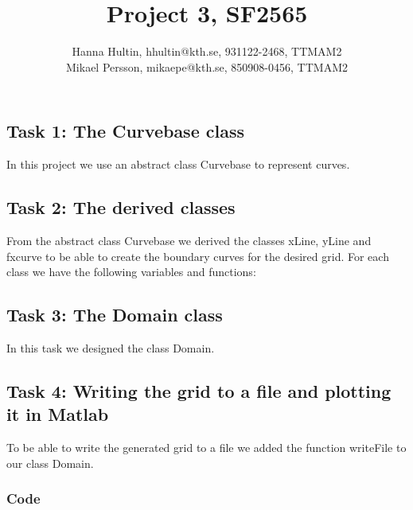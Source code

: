 \documentclass[a4paper,10pt]{article}
\title{Project 3, SF2565}
\author{Hanna Hultin, hhultin@kth.se, 931122-2468, TTMAM2 \\ Mikael Persson, mikaepe@kth.se, 850908-0456, TTMAM2}
\begin{document}
\maketitle
\subsection*{Task 1: The Curvebase class}
In this project we use an abstract class Curvebase to represent curves.

\subsection*{Task 2: The derived classes}
From the abstract class Curvebase we derived the classes xLine, yLine and fxcurve to be able to create the boundary curves for the desired grid. For each class we have the following variables and functions:

\subsection*{Task 3: The Domain class}
In this task we designed the class Domain. 

\subsection*{Task 4: Writing the grid to a file and plotting it in Matlab}
To be able to write the generated grid to a file we added the function writeFile to our class Domain. 


\newpage
\subsubsection*{Code}


\end{document}
